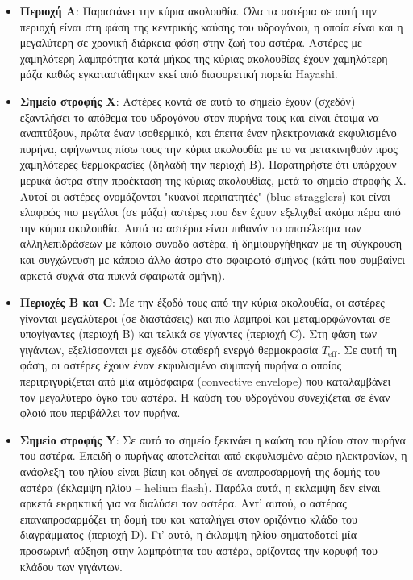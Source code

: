 \begin{itemize}
    \item \textbf{Περιοχή A}: Παριστάνει την κύρια ακολουθία. Όλα τα αστέρια σε αυτή την περιοχή είναι στη φάση της κεντρικής καύσης του υδρογόνου, η οποία είναι και η μεγαλύτερη σε χρονική διάρκεια φάση στην ζωή του αστέρα. Αστέρες με χαμηλότερη λαμπρότητα κατά μήκος της κύριας ακολουθίας έχουν χαμηλότερη μάζα καθώς εγκαταστάθηκαν εκεί από διαφορετική πορεία Hayashi.
    \item \textbf{Σημείο στροφής X}: Αστέρες κοντά σε αυτό το σημείο έχουν (σχεδόν) εξαντλήσει το απόθεμα του υδρογόνου στον πυρήνα τους και είναι έτοιμα να αναπτύξουν, πρώτα έναν ισοθερμικό, και έπειτα έναν ηλεκτρονιακά εκφυλισμένο πυρήνα, αφήνωντας πίσω τους την κύρια ακολουθία με το να μετακινηθούν προς χαμηλότερες θερμοκρασίες (δηλαδή την περιοχή B). Παρατηρήστε ότι υπάρχουν μερικά άστρα στην προέκταση της κύριας ακολουθίας, μετά το σημείο στροφής X. Αυτοί οι αστέρες ονομάζονται "κυανοί περιπατητές" (blue stragglers) και είναι ελαφρώς πιο μεγάλοι (σε μάζα) αστέρες που δεν έχουν εξελιχθεί ακόμα πέρα από την κύρια ακολουθία. Αυτά τα αστέρια είναι πιθανόν το αποτέλεσμα των αλληλεπιδράσεων με κάποιο συνοδό αστέρα, ή δημιουργήθηκαν με τη σύγκρουση και συγχώνευση με κάποιο άλλο άστρο στο σφαιρωτό σμήνος (κάτι που συμβαίνει αρκετά συχνά στα πυκνά σφαιρωτά σμήνη).
    \item \textbf{Περιοχές B και C}: Με την έξοδό τους από την κύρια ακολουθία, οι αστέρες γίνονται μεγαλύτεροι (σε διαστάσεις) και πιο λαμπροί και μεταμορφώνονται σε υπογίγαντες (περιοχή B) και τελικά σε γίγαντες (περιοχή C). Στη φάση των γιγάντων, εξελίσσονται με σχεδόν σταθερή ενεργό θερμοκρασία $T_{\text{eff}}$. Σε αυτή τη φάση, οι αστέρες έχουν έναν εκφυλισμένο συμπαγή πυρήνα ο οποίος περιτριγυρίζεται από μία ατμόσφαιρα (convective envelope) που καταλαμβάνει τον μεγαλύτερο όγκο του αστέρα. Η καύση του υδρογόνου συνεχίζεται σε έναν φλοιό που περιβάλλει τον πυρήνα.  
    \item \textbf{Σημείο στροφής Y}: Σε αυτό το σημείο ξεκινάει η καύση του ηλίου στον πυρήνα του αστέρα. Επειδή ο πυρήνας αποτελείται από εκφυλισμένο αέριο ηλεκτρονίων, η ανάφλεξη του ηλίου είναι βίαιη και οδηγεί σε αναπροσαρμογή της δομής του αστέρα (έκλαμψη ηλίου -- helium flash). Παρόλα αυτά, η εκλαμψη δεν είναι αρκετά εκρηκτική για να διαλύσει τον αστέρα. Αντ' αυτού, ο αστέρας επαναπροσαρμόζει τη δομή του και καταλήγει στον οριζόντιο κλάδο του διαγράμματος (περιοχή D). Γι' αυτό, η έκλαμψη ηλίου σηματοδοτεί μία προσωρινή αύξηση στην λαμπρότητα του αστέρα, ορίζοντας την κορυφή του κλάδου των γιγάντων.

\end{itemize}
